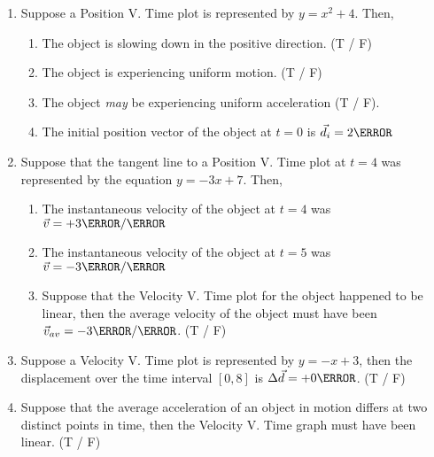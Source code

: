 \documentclass[12pt]{article} %
\begin{document}
\begin{qstn}[1]
\begin{enumerate}
        \item Suppose a Position V. Time plot is represented by $y = x^2 + 4$. Then,
            \begin{enumerate}[label = (\alph*)]
                \item The object is slowing down in the positive direction. (T / F)
                \item The object is experiencing uniform motion. (T / F)
                \item The object \emph{may} be experiencing uniform acceleration (T / F).
                \item The initial position vector of the object at $t = 0$ is $\vec d_i = 2 \m$
            \end{enumerate}
        \item Suppose that the tangent line to a Position V. Time plot at $t = 4$ was represented by the equation $y = -3x + 7$. Then,
            \begin{enumerate}[label = (\alph*)]
                \item The instantaneous velocity of the object at $t = 4$ was $\vec v = +3 \m / \s$
                \item The instantaneous velocity of the object at $t = 5$ was $\vec v = -3 \m / \s$
                \item Suppose that the Velocity V. Time plot for the object happened to be linear, then the average velocity of the object must have been $\vec v_{av} = -3\m / \s$. (T / F)
            \end{enumerate}
        \item Suppose a Velocity V. Time plot is represented by $y = -x + 3$, then the displacement over the time interval $[0,8]$ is $\Delta \vec d = +0 \m$. (T / F)
        \item Suppose that the average acceleration of an object in motion differs at two distinct points in time, then the Velocity V. Time graph must have been linear. (T / F)

    \end{enumerate}

 \end{qstn}
\end{document}
